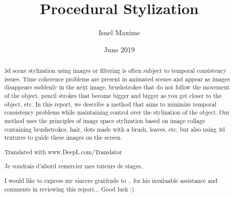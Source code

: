 \documentclass[12pt, a4paper]{memoir} %
\title{Procedural Stylization} %
\author{Isnel Maxime}
\date{June 2019} %
\begin{document}
\frontmatter
\begin{titlingpage}
\maketitle
\end{titlingpage}

\setlength{\parskip}{-1pt plus 1pt}

\renewcommand{\abstracttextfont}{\normalfont}
\abstractintoc
\begin{abstract}
    3d scene stylization using images or filtering is often subject to temporal consistency issues. Time coherence problems are present in animated scenes and appear as images disappears suddenly in the next image, brushstrokes that do not follow the movement of the object, pencil strokes that become bigger and bigger as you get closer to the object, etc. In this report, we describe a method that aims to minimize temporal consistency problems while maintaining control over the stylization of the object. Our method uses the principles of image space stylization based on image collage containing brushstrokes, hair, dots made with a brush, leaves, etc. but also using 3d textures to guide these images on the screen.

Translated with www.DeepL.com/Translator
\end{abstract}
\abstractintoc

\renewcommand\abstractname{Acknowledgement}
\begin{abstract}

    Je voudrais d'abord remercier mes tuteurs de stages, 


I would like to express my sincere gratitude to .. for his invaluable assistance and comments in reviewing this report...
Good luck :)
\end{abstract}
\end{document}
